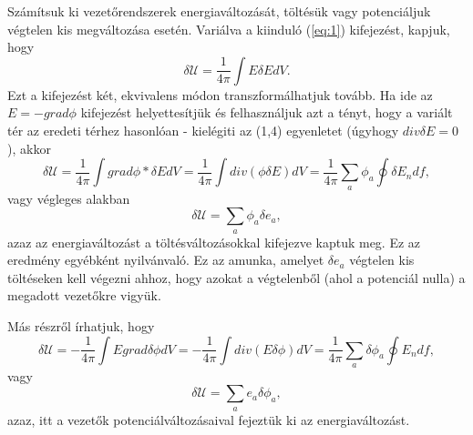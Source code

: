 \documentclass{article}
\begin{document}
Számítsuk ki vezetőrendszerek energiaváltozását, töltésük vagy potenciáljuk végtelen kis megváltozása esetén. Variálva a kiinduló (\ref{eq:1}) kifejezést, kapjuk, hogy
\begin{equation} \label{eq:7}
\delta \mathcal{U} = \frac{1}{4 \pi} \int E \delta EdV .
\end{equation}
Ezt a kifejezést két, ekvivalens módon transzformálhatjuk tovább. Ha ide az $E = -grad\phi$ kifejezést helyettesítjük és felhasználjuk azt a tényt, hogy a variált tér az eredeti térhez hasonlóan - kielégiti az (1,4) egyenletet (úgyhogy $div \delta E = 0$), akkor
\begin{equation} \label{eq:8}
\delta \mathcal{U} = \frac{1}{4 \pi} \int grad \phi * \delta EdV = \frac{1}{4\pi} \int div(\phi \delta E)dV = \frac{1}{4\pi} \sum\limits_a \phi_a \oint \delta E_n df,
\end{equation}
vagy végleges alakban
\begin{equation} \label{eq:9}
\delta \mathcal{U} = \sum\limits_a \phi_a \delta e_a ,
\end{equation}
azaz az energiaváltozást a töltésváltozásokkal kifejezve kaptuk meg. Ez az eredmény egyébként nyilvánvaló. Ez az amunka, amelyet $\delta e_a$ végtelen kis töltéseken kell végezni ahhoz, hogy azokat a végtelenből (ahol a potenciál nulla) a megadott vezetőkre vigyük.

Más részről írhatjuk, hogy
\begin{equation} \label{eq:10}
\delta \mathcal{U} = -\frac{1}{4 \pi} \int Egrad \delta \phi dV=-\frac{1}{4 \pi} \int div(E \delta \phi)dV= \frac{1}{4 \pi} \sum\limits_a \delta \phi_a \oint E_n df,
\end{equation}
vagy
\begin{equation} \label{eq:11}
\delta \mathcal{U} = \sum\limits_a e_a \delta \phi_a ,
\end{equation}
azaz, itt a vezetők potenciálváltozásaival fejeztük ki az energiaváltozást.
\end{document}
